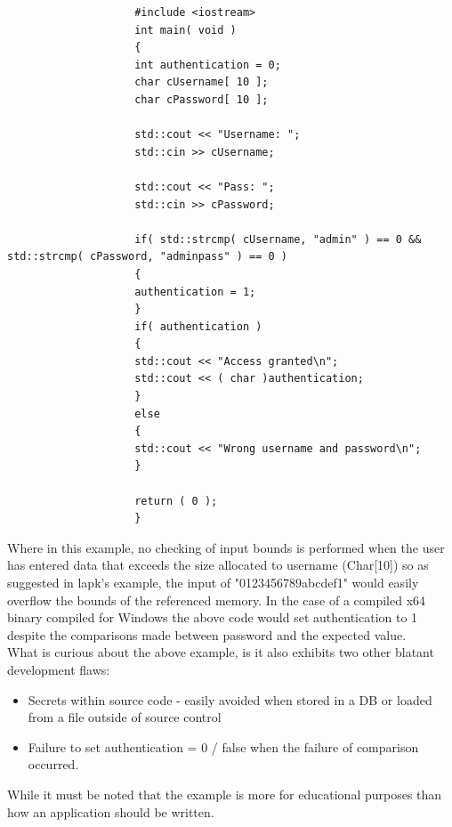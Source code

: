 \documentclass{IEEEtran}
\begin{document}
                \lstset{style=cplusplus}
                \begin{lstlisting}
                    #include <iostream>
                    int main( void )
                    {
                    int authentication = 0;
                    char cUsername[ 10 ];
                    char cPassword[ 10 ];

                    std::cout << "Username: ";
                    std::cin >> cUsername;

                    std::cout << "Pass: ";
                    std::cin >> cPassword;

                    if( std::strcmp( cUsername, "admin" ) == 0 && std::strcmp( cPassword, "adminpass" ) == 0 )
                    {
                    authentication = 1;
                    }
                    if( authentication )
                    {
                    std::cout << "Access granted\n";
                    std::cout << ( char )authentication;
                    }
                    else
                    {
                    std::cout << "Wrong username and password\n";
                    }

                    return ( 0 );
                    }
                \end{lstlisting}

                Where in this example, no checking of input bounds is performed when the user has 
                entered data that exceeds the size allocated to username (Char[10]) so as suggested 
                in lapk's\cite{lapk} example, the input of "0123456789abcdef1" would easily overflow
                the bounds of the referenced memory. In the case of a compiled x64 binary compiled for 
                Windows the above code would set authentication to 1 despite the comparisons made between password and the expected value.
                \\
                What is curious about the above example, is it also exhibits two other blatant 
                development flaws\cite{OWASP-SCP-Quick-Reference-Guide-v2}: 
                \begin{itemize}
                    \item Secrets within source code - easily avoided when stored in a DB or loaded
                    from a file outside of source control
                    \item Failure to set authentication = 0 / false when the failure of comparison 
                    occurred.
                \end{itemize}
                While it must be noted that the example is more for educational purposes than how an 
                application should be written.
\end{document}
